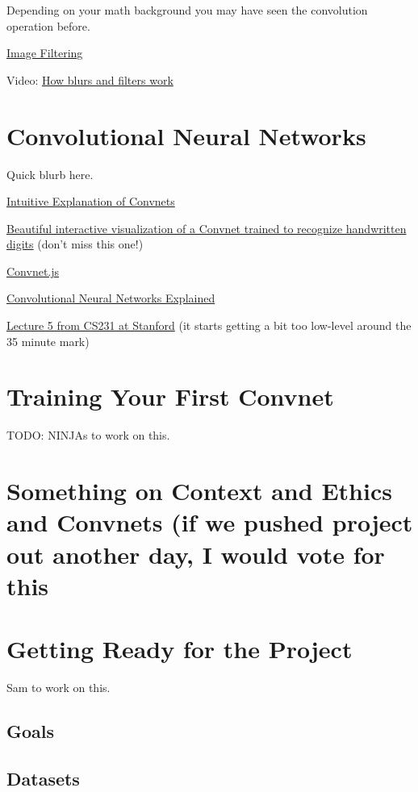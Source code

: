 \documentclass[assignment07_Solutions]{subfiles}
\begin{document}
Depending on your math background you may have seen the convolution operation before.

\begin{externalresources}[(30 minutes)]
\bi
\item \href{http://machinelearninguru.com/computer_vision/basics/convolution/image_convolution_1.html}{Image Filtering}
\item Video: \href{https://www.youtube.com/watch?v=C_zFhWdM4ic}{How blurs and filters work}
\ei
\end{externalresources}

\section{Convolutional Neural Networks}
Quick blurb here.
\begin{externalresources}[(60 minutes)]
\bi
\item \href{https://ujjwalkarn.me/2016/08/11/intuitive-explanation-convnets/}{Intuitive Explanation of Convnets}
\item \href{http://scs.ryerson.ca/~aharley/vis/conv/flat.html}{Beautiful interactive visualization of a Convnet trained to recognize handwritten digits} (don't miss this one!)
\item \href{https://cs.stanford.edu/people/karpathy/convnetjs/}{Convnet.js}
\item \href{https://www.datascience.com/blog/convolutional-neural-network}{Convolutional Neural Networks Explained}
\item \href{https://www.youtube.com/watch?v=bNb2fEVKeEo&list=PL3FW7Lu3i5JvHM8ljYj-zLfQRF3EO8sYv\&index=5}{Lecture 5 from CS231 at Stanford} (it starts getting a bit too low-level around the 35 minute mark)
\ei
\end{externalresources}

\section{Training Your First Convnet}

TODO: NINJAs to work on this.

\section{Something on Context and Ethics and Convnets (if we pushed project out another day, I would vote for this}

\section{Getting Ready for the Project}
Sam to work on this.
\subsection{Goals}
\subsection{Datasets}
\end{document}
